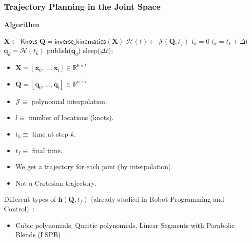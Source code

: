 \documentclass[10pt, aspectratio=169]{beamer}
\theoremstyle{remark}
\theoremstyle{definition}
\begin{document}
\begin{frame}[allowframebreaks]
\frametitle{Trajectory Planning in the Joint Space}

\textbf{\textcolor{uma_blue_dark}{Algorithm}}

\begin{minipage}[T!]{.48\linewidth}
\begin{algorithm}[H]
	$\mathbf{X} \gets \textsf{Knots}$\;
    $\mathbf{Q} = \textsf{inverse\_kinematics}(\mathbf{X})$\;
    $\mathcal{H}(t) \gets \mathcal{J}(\mathbf{Q}, t_f)$\;
    $t_k = 0$\;
 	{
        $t_k = t_k + \Delta t$\;
        $\mathbf{q}_{d} = \mathcal{H}(t_k)$\;
        publish($\mathbf{q}_{d}$)\;
        sleep($\Delta t$);
  	}
\end{algorithm}
\end{minipage}
\begin{minipage}[T!]{.42\linewidth}
\begin{itemize}
    \item $\mathbf{X} = [\mathbf{x}_0, \dots, \mathbf{x}_l]\in\mathbb{R}^{6 \times l}$
    \item $\mathbf{Q} = [\mathbf{q}_0, \dots, \mathbf{q}_l]\in\mathbb{R}^{n \times l}$
    \item $\mathcal{J}\equiv$ polynomial interpolation.
    \item $l \equiv$ number of locations (knots).
    \item $t_k \equiv$ time at step $k$.
    \item $t_f \equiv$ final time.
    \item We get a trajectory for each joint (by interpolation).
    \item Not a Cartesian trajectory.
\end{itemize}
\end{minipage}

Different types of $\boldsymbol{h}(\mathbf{Q}, t_f)$ (already studied in Robot Programming and Control)~\cite{joint_trajectory_planning}:
\begin{itemize}
    \item Cubic polynomials, Quintic polynomials, Linear Segments with Parabolic Blends (LSPB)~\cite{point_to_point}.
\end{itemize}


\end{frame}
\end{document}
